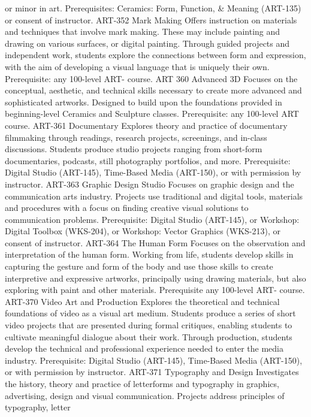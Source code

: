 \documentclass[
  letterpaper,
]{scrbook}
\begin{document}
or minor in art. Prerequisites: Ceramics: Form, Function, \& Meaning
(ART-135) or consent of instructor. ART-352 Mark Making Offers
instruction on materials and techniques that involve mark making. These
may include painting and drawing on various surfaces, or digital
painting. Through guided projects and independent work, students explore
the connections between form and expression, with the aim of developing
a visual language that is uniquely their own. Prerequisite: any
100-level ART- course. ART 360 Advanced 3D Focuses on the conceptual,
aesthetic, and technical skills necessary to create more advanced and
sophisticated artworks. Designed to build upon the foundations provided
in beginning-level Ceramics and Sculpture classes. Prerequisite: any
100-level ART course. ART-361 Documentary Explores theory and practice
of documentary filmmaking through readings, research projects,
screenings, and in-class discussions. Students produce studio projects
ranging from short-form documentaries, podcasts, still photography
portfolios, and more. Prerequisite: Digital Studio (ART-145), Time-Based
Media (ART-150), or with permission by instructor. ART-363 Graphic
Design Studio Focuses on graphic design and the communication arts
industry. Projects use traditional and digital tools, materials and
procedures with a focus on finding creative visual solutions to
communication problems. Prerequisite: Digital Studio (ART-145), or
Workshop: Digital Toolbox (WKS-204), or Workshop: Vector Graphics
(WKS-213), or consent of instructor. ART-364 The Human Form Focuses on
the observation and interpretation of the human form. Working from life,
students develop skills in capturing the gesture and form of the body
and use those skills to create interpretive and expressive artworks,
principally using drawing materials, but also exploring with paint and
other materials. Prerequisite any 100-level ART- course. ART-370 Video
Art and Production Explores the theoretical and technical foundations of
video as a visual art medium. Students produce a series of short video
projects that are presented during formal critiques, enabling students
to cultivate meaningful dialogue about their work. Through production,
students develop the technical and professional experience needed to
enter the media industry. Prerequisite: Digital Studio (ART-145),
Time-Based Media (ART-150), or with permission by instructor. ART-371
Typography and Design Investigates the history, theory and practice of
letterforms and typography in graphics, advertising, design and visual
communication. Projects address principles of typography, letter
\end{document}
